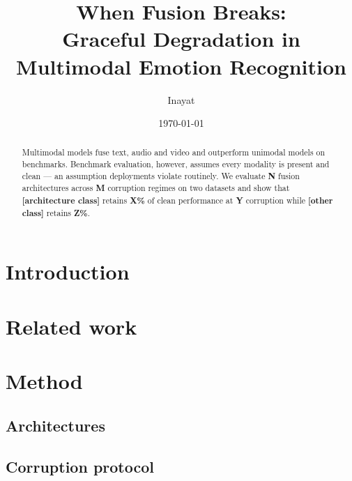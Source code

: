 \documentclass[11pt,a4paper]{article}
\title{When Fusion Breaks:\\
       Graceful Degradation in Multimodal Emotion Recognition}
\author{Inayat}
\date{\today}
\begin{document}
\maketitle

\begin{abstract}
Multimodal models fuse text, audio and video and outperform unimodal models on
benchmarks. Benchmark evaluation, however, assumes every modality is present and clean —
an assumption deployments violate routinely. We evaluate \textbf{N} fusion architectures
across \textbf{M} corruption regimes on two datasets and show that
\textbf{[architecture class]} retains \textbf{X\%} of clean performance at \textbf{Y}
corruption while \textbf{[other class]} retains \textbf{Z\%}.
\end{abstract}

\section{Introduction}

\section{Related work}

\section{Method}
\subsection{Architectures}

\subsection{Corruption protocol}
\end{document}
